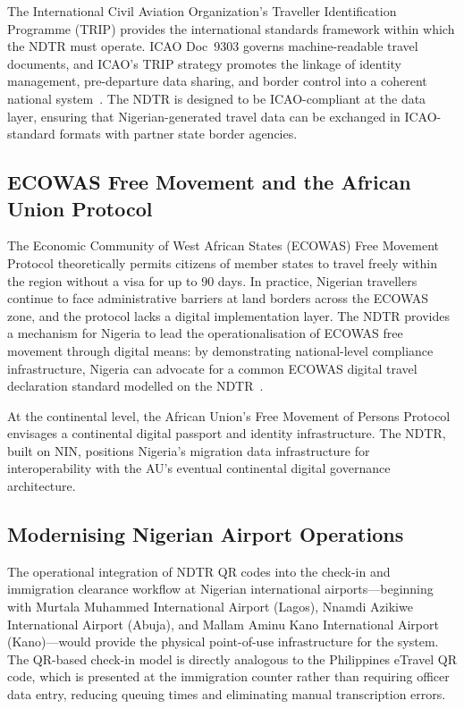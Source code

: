 \documentclass[11pt]{article}
\begin{document}
The International Civil Aviation Organization's Traveller Identification
Programme (TRIP) provides the international standards framework within
which the NDTR must operate. ICAO Doc~9303 governs machine-readable
travel documents, and ICAO's TRIP strategy promotes the linkage of
identity management, pre-departure data sharing, and border control
into a coherent national system~\cite{icao2023}. The NDTR is designed
to be ICAO-compliant at the data layer, ensuring that Nigerian-generated
travel data can be exchanged in ICAO-standard formats with partner
state border agencies.

\subsection{ECOWAS Free Movement and the African Union Protocol}

The Economic Community of West African States (ECOWAS) Free Movement
Protocol theoretically permits citizens of member states to travel
freely within the region without a visa for up to 90 days.
In practice, Nigerian travellers continue to face administrative
barriers at land borders across the ECOWAS zone, and the protocol
lacks a digital implementation layer.
The NDTR provides a mechanism for Nigeria to lead the
operationalisation of ECOWAS free movement through digital means:
by demonstrating national-level compliance infrastructure,
Nigeria can advocate for a common ECOWAS digital travel declaration
standard modelled on the NDTR~\cite{ecowas2022}.

At the continental level, the African Union's Free Movement
of Persons Protocol envisages a continental digital passport and
identity infrastructure. The NDTR, built on NIN, positions Nigeria's
migration data infrastructure for interoperability with the AU's
eventual continental digital governance architecture.

\subsection{Modernising Nigerian Airport Operations}

The operational integration of NDTR QR codes into the check-in
and immigration clearance workflow at Nigerian international
airports---beginning with Murtala Muhammed International Airport
(Lagos), Nnamdi Azikiwe International Airport (Abuja), and
Mallam Aminu Kano International Airport (Kano)---would provide
the physical point-of-use infrastructure for the system.
The QR-based check-in model is directly analogous to the
Philippines eTravel QR code, which is presented at the immigration
counter rather than requiring officer data entry, reducing
queuing times and eliminating manual transcription errors.
\end{document}
